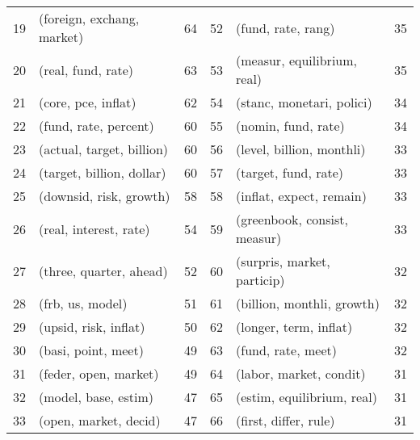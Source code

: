 \begin{tabular}{rlrrlr}
 19 &  (foreign, exchang, market) &     64 &  52 &            (fund, rate, rang) &     35 \\
 20 &          (real, fund, rate) &     63 &  53 &   (measur, equilibrium, real) &     35 \\
 21 &         (core, pce, inflat) &     62 &  54 &     (stanc, monetari, polici) &     34 \\
 22 &       (fund, rate, percent) &     60 &  55 &           (nomin, fund, rate) &     34 \\
 23 &   (actual, target, billion) &     60 &  56 &     (level, billion, monthli) &     33 \\
 24 &   (target, billion, dollar) &     60 &  57 &          (target, fund, rate) &     33 \\
 25 &     (downsid, risk, growth) &     58 &  58 &      (inflat, expect, remain) &     33 \\
 26 &      (real, interest, rate) &     54 &  59 &  (greenbook, consist, measur) &     33 \\
 27 &     (three, quarter, ahead) &     52 &  60 &   (surpris, market, particip) &     32 \\
 28 &            (frb, us, model) &     51 &  61 &    (billion, monthli, growth) &     32 \\
 29 &       (upsid, risk, inflat) &     50 &  62 &        (longer, term, inflat) &     32 \\
 30 &         (basi, point, meet) &     49 &  63 &            (fund, rate, meet) &     32 \\
 31 &       (feder, open, market) &     49 &  64 &       (labor, market, condit) &     31 \\
 32 &        (model, base, estim) &     47 &  65 &    (estim, equilibrium, real) &     31 \\
 33 &       (open, market, decid) &     47 &  66 &         (first, differ, rule) &     31 \\
\bottomrule
\end{tabular}
